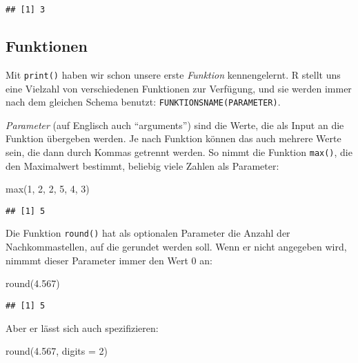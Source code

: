 \documentclass[11pt,german,a4paper]{article}
\newenvironment{Shaded}{\begin{snugshade}}{\end{snugshade}}
\newcommand{\AttributeTok}[1]{\textcolor[rgb]{0.77,0.63,0.00}{#1}}
\newcommand{\DecValTok}[1]{\textcolor[rgb]{0.00,0.00,0.81}{#1}}
\newcommand{\FloatTok}[1]{\textcolor[rgb]{0.00,0.00,0.81}{#1}}
\newcommand{\FunctionTok}[1]{\textcolor[rgb]{0.00,0.00,0.00}{#1}}
\newcommand{\NormalTok}[1]{#1}
\begin{document}
\begin{verbatim}
## [1] 3
\end{verbatim}

\hypertarget{funktionen}{%
\subsection{Funktionen}\label{funktionen}}

Mit \texttt{print()} haben wir schon unsere erste \emph{Funktion} kennengelernt. R stellt uns eine Vielzahl von verschiedenen Funktionen zur Verfügung, und sie werden immer nach dem gleichen Schema benutzt: \texttt{FUNKTIONSNAME(PARAMETER)}.

\emph{Parameter} (auf Englisch auch ``arguments'') sind die Werte, die als Input an die Funktion übergeben werden. Je nach Funktion können das auch mehrere Werte sein, die dann durch Kommas getrennt werden. So nimmt die Funktion \texttt{max()}, die den Maximalwert bestimmt, beliebig viele Zahlen als Parameter:

\begin{Shaded}
\begin{Highlighting}[]
\FunctionTok{max}\NormalTok{(}\DecValTok{1}\NormalTok{, }\DecValTok{2}\NormalTok{, }\DecValTok{2}\NormalTok{, }\DecValTok{5}\NormalTok{, }\DecValTok{4}\NormalTok{, }\DecValTok{3}\NormalTok{)}
\end{Highlighting}
\end{Shaded}

\begin{verbatim}
## [1] 5
\end{verbatim}

Die Funktion \texttt{round()} hat als optionalen Parameter die Anzahl der Nachkommastellen, auf die gerundet werden soll. Wenn er nicht angegeben wird, nimmmt dieser Parameter immer den Wert 0 an:

\begin{Shaded}
\begin{Highlighting}[]
\FunctionTok{round}\NormalTok{(}\FloatTok{4.567}\NormalTok{)}
\end{Highlighting}
\end{Shaded}

\begin{verbatim}
## [1] 5
\end{verbatim}

Aber er lässt sich auch spezifizieren:

\begin{Shaded}
\begin{Highlighting}[]
\FunctionTok{round}\NormalTok{(}\FloatTok{4.567}\NormalTok{, }\AttributeTok{digits =} \DecValTok{2}\NormalTok{)}
\end{Highlighting}
\end{Shaded}
\end{document}
